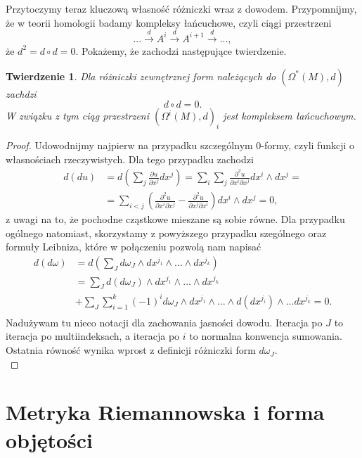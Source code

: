 \documentclass[licencjacka]{pracamgr}
\theoremstyle{definition}
\theoremstyle{definition}
\theoremstyle{plain}
\theoremstyle{plain}
\theoremstyle{plain}
\newtheorem{theorem}{Twierdzenie}[section]
\theoremstyle{plain}
\begin{document}
Przytoczymy teraz kluczową własność różniczki wraz z dowodem.
Przypomnijmy, że w teorii homologii badamy kompleksy łańcuchowe, czyli
ciągi przestrzeni
\[
   ... \xrightarrow{d} 
A^i 
   \xrightarrow{d} 
A^{i+1}
   \xrightarrow{d} 
...,
\]
że $d^2 = d \circ d = 0$. Pokażemy, że zachodzi następujące twierdzenie.
\begin{theorem}
Dla różniczki zewnętrznej form należących do $\left(\Omega^\ast (M), d \right)$
zachdzi
\[
d \circ d = 0.
\]
W związku z tym ciąg przestrzeni  $\left(\Omega^i (M), d \right)_i$ jest
kompleksem łańcuchowym.
\end{theorem}

\begin{proof}
Udowodnijmy najpierw na przypadku szczególnym 0-formy, czyli funkcji o
własnościach rzeczywistych. Dla tego przypadku zachodzi
\begin{align*}
d(du) & = d \left( \sum_j \frac{\partial u} {\partial x^j} dx^j \right) =
\sum_i \sum_j \frac{\partial^2 u}{\partial x^i \partial x^j } dx^i \wedge dx^j =  \\
& = \sum_{i < j} \left(
\frac{\partial^2 u}{\partial x^i \partial x^j}  -
\frac{\partial^2 u}{\partial x^j \partial x^i} 
 \right) dx^i \wedge dx^j = 0,
\end{align*}
z uwagi na to, że pochodne cząstkowe mieszane są sobie równe. 
Dla przypadku ogólnego natomiast, skorzystamy z powyższego przypadku szególnego
oraz formuły Leibniza, które w połączeniu pozwolą nam napisać
\begin{align*}
d(d \omega) & = d \left( \sum_J d \omega_J \wedge dx^{j_1} \wedge ... \wedge dx^{j_k} \right) \\
             & = \sum_J d( d\omega_J) \wedge dx^{j_1} \wedge ... \wedge dx^{j_k}  \\
& + \sum_J \sum_{i=1}^k (-1)^i d \omega_J \wedge dx^{j_1} \wedge ... \wedge d(dx^{j_i}) \wedge ... dx^{j_k} = 0.  \\
\end{align*}
Nadużywam tu nieco notacji dla zachowania jasności dowodu. Iteracja po $J$ to iteracja
po multiindeksach, a iteracja po $i$ to normalna konwencja sumowania. Ostatnia
równość wynika wprost z definicji różniczki form $d \omega_J$. \\

\end{proof}




\section{Metryka Riemannowska i forma objętości}
\end{document}
